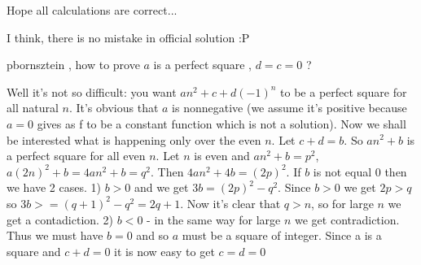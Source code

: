 \begin{solution}
	\begin{tcolorbox}
Hope all calculations are correct...\end{tcolorbox}

I think, there is no mistake in official solution :P
\end{solution}






\begin{solution}
	\begin{italicized}pbornsztein , how to prove $ a$ is a perfect square , $ d = c = 0$ ?\end{italicized}
\end{solution}



\begin{solution}
	Well it's not so difficult: you want $ an^2+c+d(-1)^n$ to be a perfect square for all natural $ n$. It's obvious that $ a$ is nonnegative (we assume it's positive because $ a=0$ gives as f to be a constant function which is not a solution). Now we shall be interested what is happening only over the even $ n$. Let $ c+d=b$. So $ an^2+b$ is a perfect square for all even $ n$. Let $ n$ is even and $ an^2+b=p^2$, $ a(2n)^2+b=4an^2+b=q^2$. Then $ 4an^2+4b=(2p)^2$. If $ b$ is not equal 0 then we have 2 cases. 
1) $ b>0$ and we get $ 3b=(2p)^2-q^2$. Since $ b>0$ we get $ 2p>q$ so $ 3b>=(q+1)^2-q^2=2q+1$. Now it's clear that $ q>n$, so for large $ n$ we get a contadiction. 
2) $ b<0$ - in the same way for large $ n$ we get contradiction.
Thus we must have $ b=0$ and so $ a$ must be a square of integer. Since a is a square and $ c+d=0$ it is now easy to get $ c=d=0$  
\end{solution}



